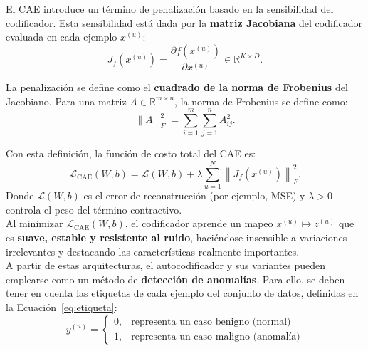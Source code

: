 \documentclass[a4paper,10pt]{book}
\begin{document}
El CAE introduce un término de penalización basado en la sensibilidad del codificador. Esta sensibilidad está dada por la \textbf{matriz Jacobiana} del codificador evaluada en cada ejemplo $x^{(u)}$:
\begin{equation}
	J_f(x^{(u)}) = 
	\frac{\partial f(x^{(u)})}{\partial x^{(u)}} 
	\in \mathbb{R}^{K \times D}.
	\label{eq:matriz_jacobiana}
\end{equation}

La penalización se define como el \textbf{cuadrado de la norma de Frobenius} del Jacobiano. Para una matriz $A \in \mathbb{R}^{m \times n}$, la norma de Frobenius se define como:
\begin{equation}
	\|A\|_{F}^{2}
	=
	\sum_{i=1}^{m}
	\sum_{j=1}^{n}
	A_{ij}^{2}.
	\label{eq:frobenius}
\end{equation}

Con esta definición, la función de costo total del CAE es:
\begin{equation}
	\mathcal{L}_{\text{CAE}}(W,b)
	=
	\mathcal{L}(W,b)
	+
	\lambda 
	\sum_{u=1}^{N}
	\left\| J_f\!\left(x^{(u)}\right) \right\|_{F}^{2}.
	\label{eq:loss_cae}
\end{equation}
Donde $\mathcal{L}(W,b)$ es el error de reconstrucción (por ejemplo, MSE) 
y $\lambda > 0$ controla el peso del término contractivo.\\

Al minimizar $\mathcal{L}_{\text{CAE}}(W,b)$, el codificador aprende un mapeo 
$x^{(u)} \mapsto z^{(u)}$ que es \textbf{suave, estable y resistente al ruido}, 
haciéndose insensible a variaciones irrelevantes y destacando las características realmente importantes.\\


A partir de estas arquitecturas, el autocodificador y sus variantes pueden emplearse como un método de \textbf{detección de anomalías}. Para ello, se deben tener en cuenta las etiquetas de cada ejemplo del conjunto de datos, definidas en la Ecuación~\ref{eq:etiqueta}:
\begin{equation}
	y^{(u)} =
	\begin{cases}
		0, & \text{representa un caso benigno (normal)} \\[4pt]
		1, & \text{representa un caso maligno (anomalía)}
	\end{cases}
	\label{eq:etiqueta}
\end{equation}
\end{document}
